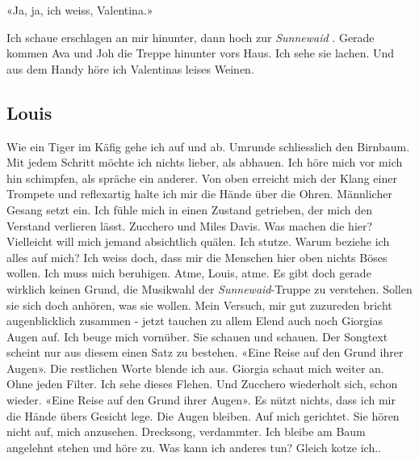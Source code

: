 «Ja, ja, ich weiss, Valentina.»

Ich schaue erschlagen an mir hinunter, dann hoch zur \emph{Sunnewaid} .
Gerade kommen Ava und Joh die Treppe hinunter vors Haus. Ich sehe sie
lachen. Und aus dem Handy höre ich Valentinas leises Weinen.

\subsection{Louis}

Wie ein Tiger im Käfig gehe ich auf und ab. Umrunde schliesslich den
Birnbaum. Mit jedem Schritt möchte ich nichts lieber, als abhauen. Ich
höre mich vor mich hin schimpfen, als spräche ein anderer. Von oben erreicht
mich der Klang einer Trompete und reflexartig halte ich mir die Hände
über die Ohren. Männlicher Gesang setzt ein. Ich fühle mich in einen
Zustand getrieben, der mich den Verstand verlieren lässt. Zucchero und
Miles Davis. Was machen die hier? Vielleicht will mich jemand
absichtlich quälen. Ich stutze. Warum beziehe ich alles auf mich? Ich weiss doch, dass mir die Menschen hier oben nichts Böses wollen.
Ich muss mich beruhigen. Atme, Louis, atme. Es gibt doch
gerade wirklich keinen Grund, die Musikwahl der \emph{Sunnewaid}-Truppe
zu verstehen. Sollen sie sich doch anhören, was sie wollen. Mein Versuch, mir gut zuzureden bricht augenblicklich zusammen - jetzt tauchen zu allem Elend auch noch Giorgias Augen auf. Ich beuge mich vornüber. Sie schauen und schauen. Der Songtext scheint nur aus diesem einen Satz
zu bestehen. «Eine Reise auf den Grund ihrer Augen». Die restlichen
Worte blende ich aus. Giorgia schaut mich weiter an. Ohne jeden Filter. Ich sehe dieses
Flehen. Und Zucchero wiederholt sich, schon wieder. «Eine Reise auf den
Grund ihrer Augen». Es nützt nichts, dass ich mir die Hände übers
Gesicht lege. Die Augen bleiben. Auf mich gerichtet. Sie hören nicht
auf, mich anzusehen. Drecksong, verdammter. Ich bleibe am Baum angelehnt stehen und höre zu. Was kann ich anderes tun? Gleich kotze ich.. 

